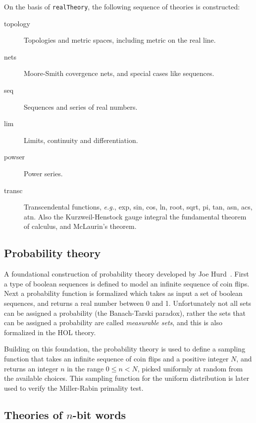 On the basis of {\small\verb+realTheory+}, the following  sequence of
theories is constructed:

\begin{description}
\item [topology] Topologies and metric spaces, including metric on
the real line.
\item [nets] Moore-Smith covergence nets, and special cases like
sequences.
\item [seq] Sequences and series of real numbers.
\item [lim] Limits, continuity and differentiation.
\item [powser] Power series.
\item [transc] Transcendental functions, \emph{e.g.}, exp, sin,
cos, ln, root, sqrt, pi, tan, asn, acs, atn. Also the Kurzweil-Henstock
gauge integral the fundamental theorem of calculus, and McLaurin's
theorem.

\end{description}

\subsection{Probability theory}\label{prob}

A foundational construction of probability theory developed by Joe
Hurd~\cite{hurd-thesis}. First a type of boolean sequences is defined
to model an infinite sequence of coin flips. Next a probability
function is formalized which takes as input a set of boolean
sequences, and returns a real number between 0 and 1. Unfortunately
not all sets can be assigned a probability (the Banach-Tarski
paradox), rather the sets that can be assigned a probability are
called \emph{measurable sets}, and this is also formalized in the
HOL theory.

Building on this foundation, the probability theory is used to define
a sampling function that takes an infinite sequence of coin flips and
a positive integer $N$, and returns an integer $n$ in the range $0\le
n < N$, picked uniformly at random from the available choices. This
sampling function for the uniform distribution is later used to verify
the Miller-Rabin primality test.


\subsection{Theories of $n$-bit words}

